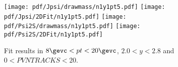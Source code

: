 \begin{figure}[H]
\begin{center}
\texttt{[image: pdf/Jpsi/drawmass/n1y1pt5.pdf]}
\texttt{[image: pdf/Jpsi/2DFit/n1y1pt5.pdf]}
\vspace*{-0.5cm}
\texttt{[image: pdf/Psi2S/drawmass/n1y1pt5.pdf]}
\texttt{[image: pdf/Psi2S/2DFit/n1y1pt5.pdf]}
\vspace*{-0.5cm}
\end{center}
\caption{Fit results in $8\gevc<pt<20\gevc$, $2.0<y<2.8$ and $0<PVNTRACKS<20$.}
\label{Fitn1y1pt5}
\end{figure}
